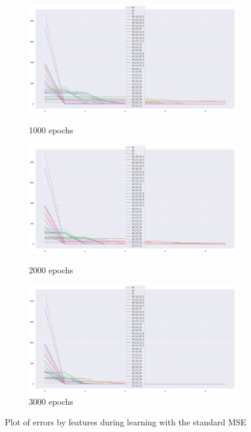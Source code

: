 \documentclass{article}
\theoremstyle{definition}
\begin{document}
\begin{figure}[H]
     \centering
     \begin{subfigure}[b]{0.49\textwidth}
         \centering
         \includegraphics[width=\textwidth]{imgs/Illu/1000Epochs/Imb/MSE_covariates_graph.png}
         \caption{1000 epochs}
         \quad
         \includegraphics[width=\textwidth]{imgs/Illu/2000Epochs/Imb/MSE_covariates_graph.png}
         \caption{2000 epochs}
         \quad
         \includegraphics[width=\textwidth]{imgs/Illu/3000Epochs/Imb/MSE_covariates_graph.png}
         \caption{3000 epochs}
    \end{subfigure}
     \caption{Plot of errors by features during learning with the standard MSE}  
\end{figure}
\end{document}
